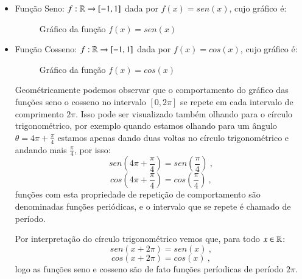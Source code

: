   \begin{itemize}
  \item Função Seno: $f: \mathbb{R} \rightarrow [-1, 1]$ dada por $f(x)= sen (x)$, cujo gráfico é:

  \begin{figure}[H]
  \centering
    \caption{Gráfico da função $f(x)= sen (x)$}
  \end{figure}

  \item Função Cosseno: $f: \mathbb{R} \rightarrow [-1, 1]$ dada por $f(x)= cos (x)$, cujo gráfico é:

  \begin{figure}[H]
  \centering
    \caption{Gráfico da função $f(x)= cos (x)$}
  \end{figure}
  
  Geométricamente podemos observar que o comportamento do gráfico das funções seno o cosseno no intervalo $[0, 2\pi]$ se repete em cada intervalo de comprimento $2\pi$. Isso pode ser visualizado também olhando para o círculo trigonométrico, por exemplo quando estamos olhando para um ângulo $\theta= 4\pi + \frac{\pi}{4}$ estamos apenas dando duas voltas no círculo trigonométrico e andando mais $\frac{\pi}{4}$, por isso:
  \[sen(4\pi + \frac{\pi}{4})= sen(\frac{\pi}{4}) \ ,\]
  \[cos(4\pi + \frac{\pi}{4})= cos(\frac{\pi}{4}) \ , \]
  funções com esta propriedade de repetição de comportamento são denominadas funções periódicas, e o intervalo que se repete é chamado de período.
  
  Por interpretação do círculo trigonométrico vemos que, para todo $x \in \mathbb{R}$:
  \[sen(x + 2 \pi)= sen(x) \ ,\]
  \[cos(x + 2\pi)= cos(x) \ , \]
  logo as funções seno e cosseno são de fato funções períodicas de período $2\pi$.
  

\end{itemize}
